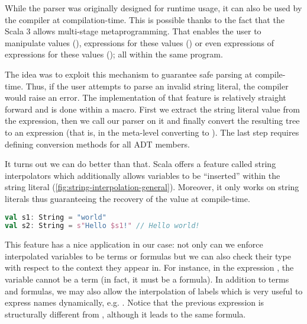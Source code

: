While the parser was originally designed for runtime usage, it can also be used by the compiler at compilation-time. This is possible thanks to the fact that the Scala 3 allows multi-stage metaprogramming. That enables the user to manipulate values (), expressions for these values () or even expressions of expressions for these values (); all within the same program.

The idea was to exploit this mechanism to guarantee safe parsing at compile-time. Thus, if the user attempts to parse an invalid string literal, the compiler would raise an error. The implementation of that feature is relatively straight forward and is done within a macro. First we extract the string literal value from the expression, then we call our parser on it and finally convert the resulting tree to an expression (that is, in the meta-level converting  to ). The last step requires defining conversion methods for all ADT members.

It turns out we can do better than that. Scala offers a feature called string interpolators which additionally allows variables to be ``inserted'' within the string literal (\autoref{fig:string-interpolation-general}). Moreover, it only works on string literals thus guaranteeing the recovery of the value at compile-time.

\begin{lstlisting}[language=Scala,caption={[String interpolation general example]{Simple demonstration of the string interpolation mechanism in Scala. The \code{s} interpolator simply calls \code{toString} on each variable passed and concatenates all the parts together.}},label={fig:string-interpolation-general},captionpos=b]
val s1: String = "world"
val s2: String = s"Hello $s1!" // Hello world!
\end{lstlisting}

This feature has a nice application in our case: not only can we enforce interpolated variables to be terms or formulas but we can also check their type with respect to the context they appear in. For instance, in the expression , the variable  cannot be a term (in fact, it must be a formula). In addition to terms and formulas, we may also allow the interpolation of labels which is very useful to express names dynamically, e.g. . Notice that the previous expression is structurally different from , although it leads to the same formula.

